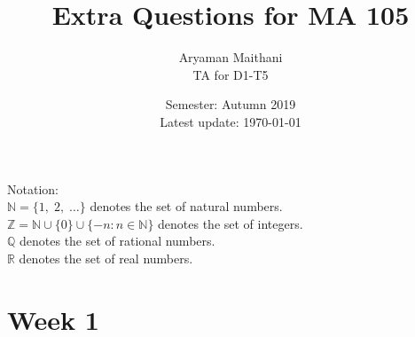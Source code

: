 \documentclass{article}
\title{Extra Questions for MA 105}
\author{Aryaman Maithani\\
\small TA for D1-T5}
\date{Semester: Autumn 2019\\ Latest update: \today}
\begin{document}
\maketitle
\hrulefill

Notation:\\
$\mathbb{N} = \{1,\; 2,\; \ldots\}$ denotes the set of natural numbers.\\
$\mathbb{Z} = \mathbb{N} \cup \{0\} \cup \{-n : n\in\mathbb{N}\}$ denotes the set of integers.\\
$\mathbb{Q}$ denotes the set of rational numbers.\\
$\mathbb{R}$ denotes the set of real numbers.\\
\section{Week 1}
\end{document}
